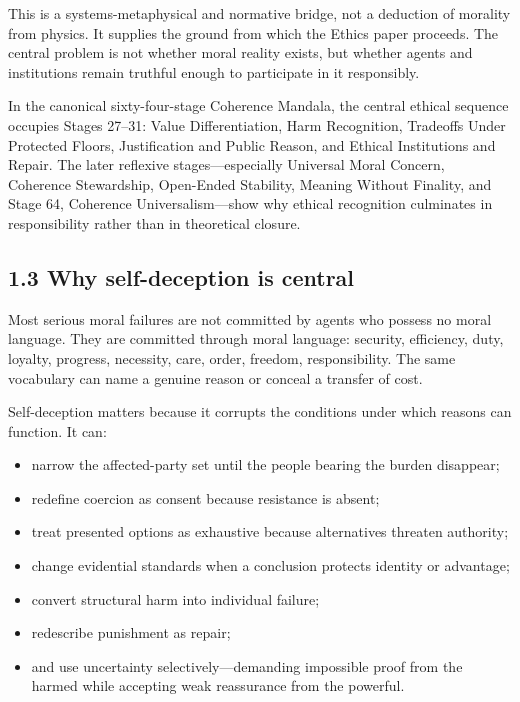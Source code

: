 \documentclass[
  11pt,
]{article}
\providecommand{\tightlist}{%
  \setlength{\itemsep}{0pt}\setlength{\parskip}{0pt}}
\begin{document}
This is a systems-metaphysical and normative bridge, not a deduction of
morality from physics. It supplies the ground from which the Ethics
paper proceeds. The central problem is not whether moral reality exists,
but whether agents and institutions remain truthful enough to
participate in it responsibly.

In the canonical sixty-four-stage Coherence Mandala, the central ethical
sequence occupies Stages 27--31: Value Differentiation, Harm
Recognition, Tradeoffs Under Protected Floors, Justification and Public
Reason, and Ethical Institutions and Repair. The later reflexive
stages---especially Universal Moral Concern, Coherence Stewardship,
Open-Ended Stability, Meaning Without Finality, and Stage 64, Coherence
Universalism---show why ethical recognition culminates in responsibility
rather than in theoretical closure.

\subsection{1.3 Why self-deception is
central}\label{why-self-deception-is-central}

Most serious moral failures are not committed by agents who possess no
moral language. They are committed through moral language: security,
efficiency, duty, loyalty, progress, necessity, care, order, freedom,
responsibility. The same vocabulary can name a genuine reason or conceal
a transfer of cost.

Self-deception matters because it corrupts the conditions under which
reasons can function. It can:

\begin{itemize}
\tightlist
\item
  narrow the affected-party set until the people bearing the burden
  disappear;
\item
  redefine coercion as consent because resistance is absent;
\item
  treat presented options as exhaustive because alternatives threaten
  authority;
\item
  change evidential standards when a conclusion protects identity or
  advantage;
\item
  convert structural harm into individual failure;
\item
  redescribe punishment as repair;
\item
  and use uncertainty selectively---demanding impossible proof from the
  harmed while accepting weak reassurance from the powerful.
\end{itemize}
\end{document}
